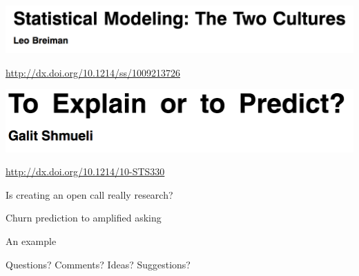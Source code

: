 \documentclass[aspectratio=169]{beamer}
\def\vf{\vfill}
\begin{document}
\begin{frame}

\begin{center}
\includegraphics[width=\textwidth]{figures/breiman_statistical_2001_title}
\end{center}

\vf
{\tiny \url{http://dx.doi.org/10.1214/ss/1009213726}}

\end{frame}
\begin{frame}

\begin{center}
\includegraphics[width=\textwidth]{figures/shmueli_explain_2010_title}
\end{center}

\vf
{\tiny \url{http://dx.doi.org/10.1214/10-STS330}}

\end{frame}
\begin{frame}

{\Large
\begin{center}
Is creating an open call really research?
\end{center}
}

\end{frame}
\begin{frame}

{\Large
\begin{center}
Churn prediction to amplified asking
\end{center}
}

\end{frame}
\begin{frame}

An example

\end{frame}
\begin{frame}

{\Large
\begin{center}
Questions?  Comments?  Ideas? Suggestions?
\end{center}
}

\end{frame}
\end{document}
